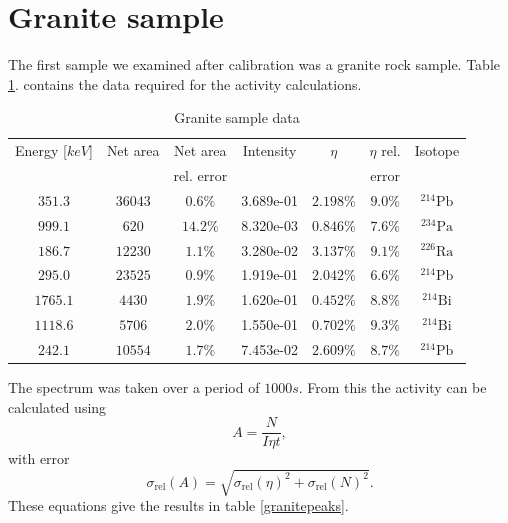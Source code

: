 \documentclass[pdftex,12pt,a4paper]{article}
\begin{document}
	\section{Granite sample}
		The first sample we examined after calibration was a granite rock sample. Table \ref{granitedata}. contains the data required for the activity calculations.
		\begin{table}[H]
		\centering
		\begin{tabular}{|c|c|c|c|c|c|c|}
			\hline
			Energy [$keV$] & Net area & Net area   & Intensity & $\eta$ & $\eta$ rel. & Isotope \\
			               &          & rel. error &           &        & error       &         \\
			\hline
            $351.3$ & $36043$ & $0.6\%$ & 3.689e-01 & $2.198\%$ & $9.0\%$ & $^{214}\text{Pb}$ \\
            $999.1$ & $620$ & $14.2\%$ & 8.320e-03 & $0.846\%$ & $7.6\%$ & $^{234}\text{Pa}$ \\
            $186.7$ & $12230$ & $1.1\%$ & 3.280e-02 & $3.137\%$ & $9.1\%$ & $^{226}\text{Ra}$ \\
            $295.0$ & $23525$ & $0.9\%$ & 1.919e-01 & $2.042\%$ & $6.6\%$ & $^{214}\text{Pb}$ \\
            $1765.1$ & $4430$ & $1.9\%$ & 1.620e-01 & $0.452\%$ & $8.8\%$ & $^{214}\text{Bi}$ \\
            $1118.6$ & $5706$ & $2.0\%$ & 1.550e-01 & $0.702\%$ & $9.3\%$ & $^{214}\text{Bi}$ \\
            $242.1$ & $10554$ & $1.7\%$ & 7.453e-02 & $2.609\%$ & $8.7\%$ & $^{214}\text{Pb}$ \\
			\hline
		\end{tabular}
		\caption{Granite sample data}
		 \label{granitedata}
		\end{table}
		The spectrum was taken over a period of $1000s$. From this the activity can be calculated using
		\begin{equation}
			A = \frac{N}{I\eta t},
			\label{activity}
		\end{equation}
		with error
		\begin{equation}
			\sigma_{\text{rel}}(A) = \sqrt{\sigma_{\text{rel}}(\eta)^2 + \sigma_{\text{rel}}(N)^2}.
		\end{equation}
		These equations give the results in table \ref{granitepeaks}.
\end{document}
